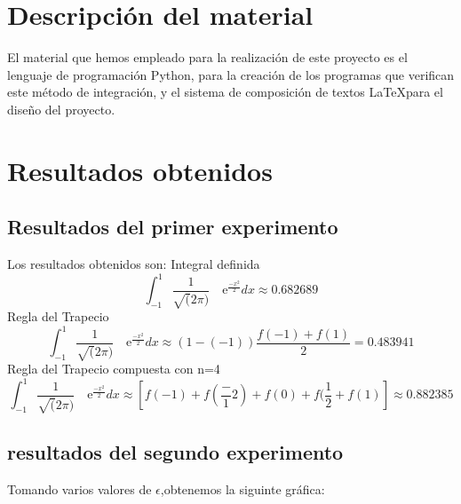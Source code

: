 \section{Descripción del material}
\label{3:sec:2}
\parindent=0.2cm
\raggedright
El material que hemos empleado para la realización de este proyecto es el lenguaje de
programación Python, para la creación de los programas que verifican este método de integración, 
y el sistema de composición de textos \LaTeX para el diseño del proyecto.


\section{Resultados obtenidos}
\label{3:sec:3}
\parindent=0.2cm
\raggedright
\subsection{Resultados del primer experimento}
Los resultados obtenidos son:
Integral definida 
\[
\int_{-1}^{1} \frac{1}{\sqrt(2\pi)} \quad\text{e}^{\frac{-x^2}{2}}dx\approx0.682689 
\]
Regla del Trapecio
\[
\int_{-1}^{1} \frac{1}{\sqrt(2\pi)} \quad\text{e}^{\frac{-x^2}{2}}dx\approx\left(1-(-1)\right)\frac{f(-1)+f(1)}{2}=0.483941
\]
Regla del Trapecio compuesta con n=4
\[
\int_{-1}^{1} \frac{1}{\sqrt(2\pi)} \quad\text{e}^{\frac{-x^2}{2}}dx\approx\left[f(-1) + f(\frac-{1}{2}) + f(0) + f(\frac{1}{2} + f(1)\right]\approx0.882385
\]
\subsection{resultados del segundo experimento}
Tomando varios valores de $\epsilon$,obtenemos la siguinte gráfica:








